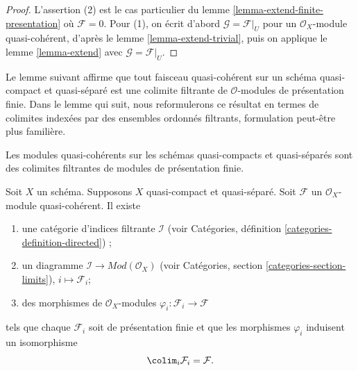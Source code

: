 \begin{proof}
L'assertion (2) est le cas particulier du lemme \ref{lemma-extend-finite-presentation}
où $\mathcal{F} = 0$. Pour (1), on écrit d'abord
$\mathcal{G} = \mathcal{F}|_U$ pour un $\mathcal{O}_X$-module
quasi-cohérent, d'après le lemme \ref{lemma-extend-trivial},
puis on applique le lemme \ref{lemma-extend} avec $\mathcal{G} = \mathcal{F}|_U$.
\end{proof}

\noindent
Le lemme suivant affirme que tout faisceau quasi-cohérent sur un schéma
quasi-compact et quasi-séparé est une colimite filtrante de $\mathcal{O}$-modules
de présentation finie. Dans le lemme qui suit, nous reformulerons ce résultat en termes de
colimites indexées par des ensembles ordonnés filtrants, formulation peut-être plus familière.

\begin{lemma}
\label{lemma-directed-colimit-diagram-finite-presentation}
\begin{slogan}
Les modules quasi-cohérents sur les schémas quasi-compacts et quasi-séparés
sont des colimites filtrantes de modules de présentation finie.
\end{slogan}
Soit $X$ un schéma. Supposons $X$ quasi-compact et quasi-séparé.
Soit $\mathcal{F}$ un $\mathcal{O}_X$-module
quasi-cohérent. Il existe
\begin{enumerate}
\item une catégorie d'indices filtrante $\mathcal{I}$ (voir
Catégories, définition \ref{categories-definition-directed}) ;
\item un diagramme $\mathcal{I} \to \textit{Mod}(\mathcal{O}_X)$ (voir
Catégories, section \ref{categories-section-limits}),
$i \mapsto \mathcal{F}_i$;
\item des morphismes de $\mathcal{O}_X$-modules
$\varphi_i : \mathcal{F}_i \to \mathcal{F}$
\end{enumerate}
tels que chaque $\mathcal{F}_i$ soit de présentation
finie et que les morphismes $\varphi_i$ induisent un isomorphisme
$$
\colim_i \mathcal{F}_i
=
\mathcal{F}.
$$
\end{lemma}

